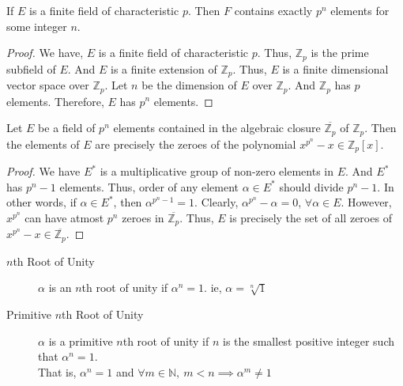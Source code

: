 \begin{corollary}
	If $E$ is a finite field of characteristic $p$. Then $F$ contains exactly $p^n$ elements for some integer $n$.
\end{corollary}
\begin{proof}
	We have, $E$ is a finite field of characteristic $p$. Thus, $\mathbb{Z}_p$ is the prime subfield of $E$. And $E$ is a finite extension of $\mathbb{Z}_p$. Thus, $E$ is a finite dimensional vector space over $\mathbb{Z}_p$. Let $n$ be the dimension of $E$ over $\mathbb{Z}_p$. And $\mathbb{Z}_p$ has $p$ elements. Therefore, $E$ has $p^n$ elements.
\end{proof}

\begin{theorem}
	Let $E$ be a field of $p^n$ elements contained in the algebraic closure $\overline{\mathbb{Z}_p}$ of $\mathbb{Z}_p$. Then the elements of $E$ are precisely the zeroes of the polynomial $x^{p^n}-x \in \mathbb{Z}_p[x]$.
\end{theorem}
\begin{proof}
	We have $E^\ast$ is a multiplicative group of non-zero elements in $E$. And $E^\ast$ has $p^n-1$ elements. Thus, order of any element $\alpha \in E^\ast$ should divide $p^n-1$. In other words, if $\alpha \in E^\ast$, then $\alpha^{p^n-1} = 1$. Clearly, $\alpha^{p^n} - \alpha = 0$, $\forall \alpha \in E$. However, $x^{p^n}$ can have atmost $p^n$ zeroes in $\overline{\mathbb{Z}_p}$. Thus, $E$ is precisely the set of all zeroes of $x^{p^n}-x \in \overline{\mathbb{Z}_p}$.
\end{proof}


\begin{description}
	\item[$n$th Root of Unity] $\alpha$ is an $n$th root of unity if $\alpha^n = 1$. ie, $\alpha = \sqrt[n]{1}$
	\item[Primitive $n$th Root of Unity] $\alpha$ is a primitive $n$th root of unity if $n$ is the smallest positive integer such that $\alpha^n = 1$.\\
		That is, $\alpha^n = 1$ and $\forall m \in \mathbb{N},\ m < n \implies \alpha^m \ne 1$
\end{description}

